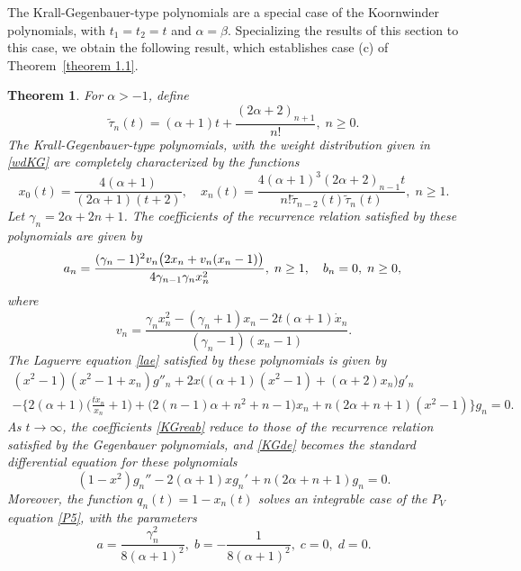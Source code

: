 \documentclass[10pt, reqno]{amsart}
\numberwithin{equation}{section}
\newtheorem{theorem}{Theorem}[section]
\numberwithin{equation}{section}
\begin{document}
The Krall-Gegenbauer-type polynomials are a special case of the Koornwinder polynomials, with $t_1=t_2=t$ and $\alpha=\beta$. Specializing the results of this section to this case, we obtain the following result, which establishes case (c) 
of Theorem~\ref{theorem 1.1}.
\begin{theorem} \label{theorem 5.3}
For $\alpha>-1$, define
\begin{equation*}
\tilde{\tau}_n(t)= (\alpha+1)t+\frac{(2\alpha+2)_{n+1}}{n!},\;n\geq 0.
\end{equation*}
The Krall-Gegenbauer-type polynomials, with the weight distribution given in \eqref{wdKG} are completely characterized by the functions 
\begin{equation} 
x_0(t)=\frac{4(\alpha+1)}{(2\alpha+1)(t+2)}, \quad x_n(t)=\frac{4(\alpha+1)^3(2\alpha+2)_{n-1}t}{n!\tilde{\tau}_{n-2}(t)\tilde{\tau}_n(t)},\;n\geq 1.\label{KGxn}
\end{equation}
Let $\gamma_n=2\alpha+2n+1$. The coefficients of the recurrence relation satisfied by these polynomials are given by
\begin{equation}
a_n=\frac{(\gamma_n-1)^2v_n\big(2x_n+v_n(x_n-1)\big)}{4\gamma_{n-1}\gamma_nx_n^2},\;n\geq 1,\quad b_n=0,\; n\geq 0,\label{KGreab}\\
\end{equation}
where
\begin{equation}
v_n=\frac{\gamma_nx_n^2-(\gamma_n+1)x_n-2t(\alpha+1)\dot{x}_n}{(\gamma_n-1)(x_n-1)}.\label{KGvy}
\end{equation}
The Laguerre equation \eqref{lae} satisfied by these polynomials is given by
\begin{multline} 
(x^2-1)(x^2-1+x_n)g''_n+2x\big((\alpha+1)(x^2-1)+(\alpha+2)x_n\big)g'_n\\
-\Big\{2(\alpha+1)\Big(\frac{t\dot{x}_n}{x_n}+1\Big)+\big(2(n-1)\alpha+n^2+n-1\big)x_n+n(2\alpha+n+1)(x^2-1)\Big\}g_n=0.\label{KGde}
\end{multline}
As $t\to\infty$, the coefficients \eqref{KGreab} reduce to those of the recurrence relation satisfied by the Gegenbauer polynomials, and \eqref{KGde} becomes the standard differential equation for these polynomials
\begin{equation}
(1-x^2)g_n''-2(\alpha+1)x g_n'+n(2\alpha+n+1)g_n=0.\label{Gde}
\end{equation}
Moreover, the function $q_n(t)=1-x_n(t)$ solves an integrable case of the $P_V$ equation \eqref{P5}, with the parameters
\begin{equation}
a=\frac{\gamma_n^2}{8(\alpha+1)^2},\;b=-\frac{1}{8(\alpha+1)^2},\;c=0,\;d=0.\label{KGP5}
\end{equation}
\end{theorem}
\end{document}
